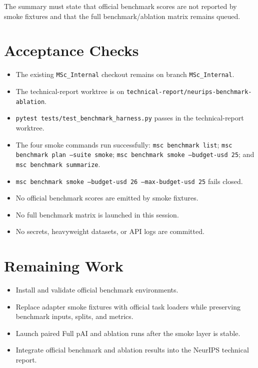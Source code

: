 \documentclass[11pt]{article}
\begin{document}
The summary must state that official benchmark scores are not reported by smoke fixtures and that the full benchmark/ablation matrix remains queued.

\section*{Acceptance Checks}

\begin{itemize}
  \item The existing \texttt{MSc\_Internal} checkout remains on branch \texttt{MSc\_Internal}.
  \item The technical-report worktree is on \texttt{technical-report/neurips-benchmark-ablation}.
  \item \texttt{pytest tests/test\_benchmark\_harness.py} passes in the technical-report worktree.
  \item The four smoke commands run successfully: \texttt{msc benchmark list}; \texttt{msc benchmark plan --suite smoke}; \texttt{msc benchmark smoke --budget-usd 25}; and \texttt{msc benchmark summarize}.
  \item \texttt{msc benchmark smoke --budget-usd 26 --max-budget-usd 25} fails closed.
  \item No official benchmark scores are emitted by smoke fixtures.
  \item No full benchmark matrix is launched in this session.
  \item No secrets, heavyweight datasets, or API logs are committed.
\end{itemize}

\section*{Remaining Work}

\begin{itemize}
  \item Install and validate official benchmark environments.
  \item Replace adapter smoke fixtures with official task loaders while preserving benchmark inputs, splits, and metrics.
  \item Launch paired Full pAI and ablation runs after the smoke layer is stable.
  \item Integrate official benchmark and ablation results into the NeurIPS technical report.
\end{itemize}
\end{document}
